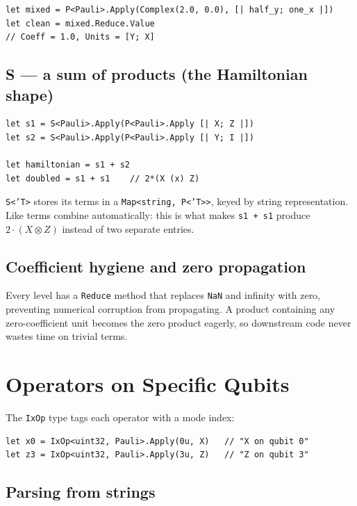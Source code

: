 \documentclass[10pt,a4paper]{article}
\begin{document}
\begin{lstlisting}
let mixed = P<Pauli>.Apply(Complex(2.0, 0.0), [| half_y; one_x |])
let clean = mixed.Reduce.Value
// Coeff = 1.0, Units = [Y; X]
\end{lstlisting}

\subsection{S --- a sum of products (the Hamiltonian shape)}

\begin{lstlisting}
let s1 = S<Pauli>.Apply(P<Pauli>.Apply [| X; Z |])
let s2 = S<Pauli>.Apply(P<Pauli>.Apply [| Y; I |])

let hamiltonian = s1 + s2
let doubled = s1 + s1    // 2*(X (x) Z)
\end{lstlisting}

\texttt{S<'T>} stores its terms in a \texttt{Map<string, P<'T>>}, keyed
by string representation.  Like terms combine automatically: this is
what makes \texttt{s1 + s1} produce $2 \cdot (X \otimes Z)$ instead of
two separate entries.

\subsection{Coefficient hygiene and zero propagation}

Every level has a \texttt{Reduce} method that replaces \texttt{NaN} and
infinity with zero, preventing numerical corruption from propagating.
A product containing any zero-coefficient unit becomes the zero product
eagerly, so downstream code never wastes time on trivial terms.


\section{Operators on Specific Qubits}\label{ch:ixop}

The \texttt{IxOp} type tags each operator with a mode index:

\begin{lstlisting}
let x0 = IxOp<uint32, Pauli>.Apply(0u, X)   // "X on qubit 0"
let z3 = IxOp<uint32, Pauli>.Apply(3u, Z)   // "Z on qubit 3"
\end{lstlisting}

\subsection{Parsing from strings}
\end{document}
